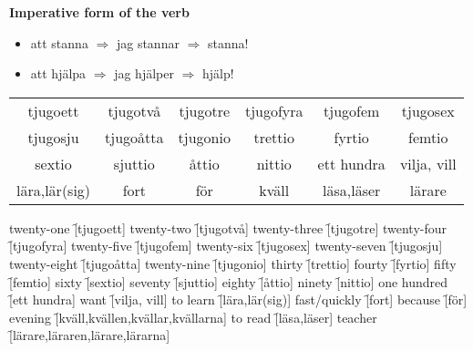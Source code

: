 
\begin{flushleft}
    \textbf{Imperative form of the verb}
    \begin{itemize}
        \item att stanna $\Rightarrow$ jag stannar $\Rightarrow$ stanna!
        \item att hjälpa $\Rightarrow$ jag hjälper $\Rightarrow$ hjälp!
    \end{itemize}
\end{flushleft}

\begin{center}
    \begin{tabular}{|c c c c c c|}
        \hline
        tjugoett & tjugotvå & tjugotre & tjugofyra & tjugofem & tjugosex \\
        tjugosju & tjugoåtta & tjugonio & trettio & fyrtio & femtio \\
        sextio & sjuttio & åttio & nittio & ett hundra & vilja, vill \\
        lära,lär(sig) & fort & för & kväll & läsa,läser & lärare \\
        \hline
    \end{tabular}
\end{center}

\begin{questions}
    \begin{multicols}{2}
        \raggedcolumns
        \question twenty-one \f[tjugoett]
        \question twenty-two \f[tjugotvå]
        \question twenty-three \f[tjugotre]
        \question twenty-four \f[tjugofyra]
        \question twenty-five \f[tjugofem]
        \question twenty-six \f[tjugosex]
        \question twenty-seven \f[tjugosju]
        \question twenty-eight \f[tjugoåtta]
        \question twenty-nine \f[tjugonio]
        \question thirty \f[trettio]
        \question fourty \f[fyrtio]
        \question fifty \f[femtio]
        \question sixty \f[sextio]
        \question seventy \f[sjuttio]
        \question eighty \f[åttio]
        \question ninety \f[nittio]
        \question one hundred \f[ett hundra]
        \question want \f[vilja, vill]
        \question to learn \f[lära,lär(sig)]
        \question fast/quickly \f[fort]
        \question because \f[för]
        \question evening \f[kväll,kvällen,kvällar,kvällarna]
        \question to read \f[läsa,läser]
        \question teacher \f[lärare,läraren,lärare,lärarna]
    \end{multicols}
\end{questions}